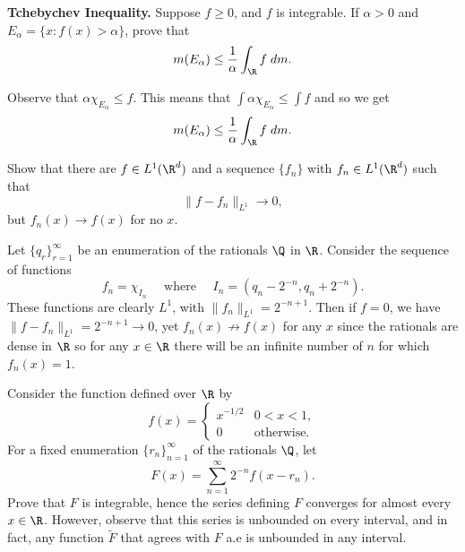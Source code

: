 \documentclass[11pt,letterpaper]{article}
\begin{document}
\begin{cproblem}{9}
    \textbf{Tchebychev Inequality.} Suppose $f\geq 0$, and $f$ is integrable. If $\alpha > 0$ and $E_\alpha = \{ x : f(x) > \alpha\}$, prove that
    \[
        m(E_\alpha) \leq \frac{1}{\alpha}\int_\R f\;dm
    .\]
\end{cproblem}

\begin{solution}
    Observe that $\alpha\chi_{E_\alpha}\leq f$. This means that $\int \alpha\chi_{E_\alpha} \leq \int f$ and so we get
    \[
        m(E_\alpha)\leq \frac{1}{\alpha}\int_\R f\; dm
    .\] 
\end{solution}

\begin{cproblem}{12}
    Show that there are $f\in L^1(\R^d)$ and a sequence $\{f_n\}$ with $f_n\in L^1(\R^d)$ such that
    \[
        \|f-f_n\|_{L^1} \to 0,
    \]
    but $f_n(x)\to f(x)$ for no $x$.  
\end{cproblem}

\begin{solution}
    Let $\{q_r\}_{r=1}^\infty$ be an enumeration of the rationals $\Q$ in $\R$. Consider the sequence of functions
    \[
        f_n = \chi_{I_n}\quad\textrm{ where }\quad I_n=(q_n-2^{-n}, q_n+2^{-n})
    .\] 
    These functions are clearly $L^1$, with $\|f_n\|_{L^1}=2^{-n+1}$. Then if $f=0$, we have $\|f-f_n\|_{L^1}=2^{-n+1}\to 0$, yet $f_n(x)\not\to f(x)$ for any $x$ since the rationals are dense in $\R$ so for any $x\in \R$ there will be an infinite number of $n$ for which $f_n(x)=1$.  
\end{solution}

\begin{cproblem}{15}
    Consider the function defined over $\R$ by
    \[
        f(x)=\begin{cases}
            x^{-1 /2} & 0<x<1,\\
            0 & \text{otherwise.}
        \end{cases}
    \]
    For a fixed enumeration $\{r_n\}^\infty_{n=1}$ of the rationals $\Q$, let
    \[
        F(x)=\sum^\infty_{n=1}2^{-n}f(x-r_n)
    .\] 
    Prove that $F$ is integrable, hence the series defining $F$ converges for almost every $x\in \R$. However, observe that this series is unbounded on every interval, and in fact, any function $\widetilde{F}$ that agrees with $F$ a.e is unbounded in any interval.
\end{cproblem}
\end{document}
